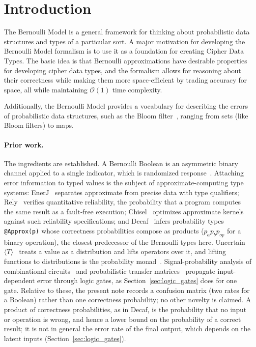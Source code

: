 \documentclass[../main.tex]{subfiles}
\begin{document}
\section{Introduction}

The Bernoulli Model is a general framework for thinking about probabilistic data structures and types of a particular sort. A major motivation for developing the Bernoulli Model formalism is to use it as a foundation for creating Cipher Data Types. The basic idea is that Bernoulli approximations have desirable properties for developing cipher data types, and the formalism allows for reasoning about their correctness while making them more space-efficient by trading accuracy for space, all while maintaining $\mathcal{O}(1)$ time complexity.

Additionally, the Bernoulli Model provides a vocabulary for describing the errors of probabilistic data structures, such as the Bloom filter~\cite{bloom1970}, ranging from sets (like Bloom filters) to maps.

\paragraph{Prior work.}
The ingredients are established. A Bernoulli Boolean is an asymmetric binary channel applied to a single indicator, which is randomized response~\cite{warner1965}. Attaching error information to typed values is the subject of approximate-computing type systems: EnerJ~\cite{sampson2011enerj} separates approximate from precise data with type qualifiers; Rely~\cite{carbin2013rely} verifies quantitative reliability, the probability that a program computes the same result as a fault-free execution; Chisel~\cite{misailovic2014chisel} optimizes approximate kernels against such reliability specifications; and Decaf~\cite{boston2015decaf} infers probability types \texttt{@Approx(p)} whose correctness probabilities compose as products ($p_a p_b p_{\mathit{op}}$ for a binary operation), the closest predecessor of the Bernoulli types here. Uncertain$\langle T\rangle$~\cite{bornholt2014uncertain} treats a value as a distribution and lifts operators over it, and lifting functions to distributions is the probability monad~\cite{giry1982categorical,ramsey2002stochastic}. Signal-probability analysis of combinational circuits~\cite{parker1975probabilistic} and probabilistic transfer matrices~\cite{krishnaswamy2008ptm} propagate input-dependent error through logic gates, as Section~\ref{sec:logic_gates} does for one gate. Relative to these, the present note records a confusion matrix (two rates for a Boolean) rather than one correctness probability; no other novelty is claimed. A product of correctness probabilities, as in Decaf, is the probability that no input or operation is wrong, and hence a lower bound on the probability of a correct result; it is not in general the error rate of the final output, which depends on the latent inputs (Section~\ref{sec:logic_gates}).
\end{document}
